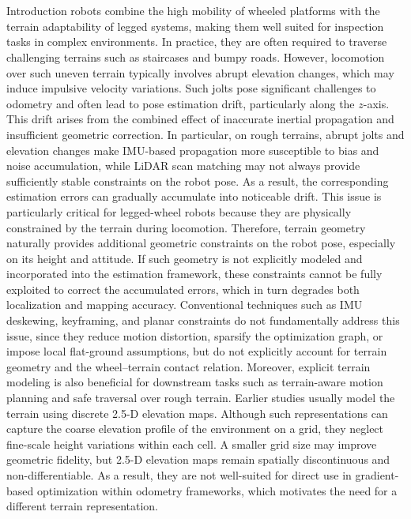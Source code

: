 \documentclass[journal,twoside,web]{ieeecolor}
\makeatletter
\let\origsection\section
\def\section{\@ifstar\sectionstarcolor\sectioncolor}
\def\sectioncolor#1{\origsection{\textcolor{nblue}{#1}}}
\def\sectionstarcolor#1{\origsection*{#1}}
\makeatother
\begin{document}
\maketitle


\section{Introduction}\label{sec:intro}
 robots combine the high mobility of wheeled platforms with the terrain adaptability of legged systems, making them well suited for inspection tasks in complex environments. In practice, they are often required to traverse challenging terrains such as staircases and bumpy roads. However, locomotion over such uneven terrain typically involves abrupt elevation changes, which may induce impulsive velocity variations.
Such jolts pose significant challenges to odometry and often lead to pose estimation drift, particularly along the $z$-axis. This drift arises from the combined effect of inaccurate inertial propagation and insufficient geometric correction. In particular, on rough terrains, abrupt jolts and elevation changes make IMU-based propagation more susceptible to bias and noise accumulation, while LiDAR scan matching may not always provide sufficiently stable constraints on the robot pose. As a result, the corresponding estimation errors can gradually accumulate into noticeable drift.
This issue is particularly critical for legged-wheel robots because they are physically constrained by the terrain during locomotion. Therefore, terrain geometry naturally provides additional geometric constraints on the robot pose, especially on its height and attitude. If such geometry is not explicitly modeled and incorporated into the estimation framework, these constraints cannot be fully exploited to correct the accumulated errors, which in turn degrades both localization and mapping accuracy. Conventional techniques such as IMU deskewing, keyframing, and planar constraints do not fundamentally address this issue, since they reduce motion distortion, sparsify the optimization graph, or impose local flat-ground assumptions, but do not explicitly account for terrain geometry and the wheel–terrain contact relation. Moreover, explicit terrain modeling is also beneficial for downstream tasks such as terrain-aware motion planning and safe traversal over rough terrain.
Earlier studies usually model the terrain using discrete 2.5-D elevation maps. Although such representations can capture the coarse elevation profile of the environment on a grid, they neglect fine-scale height variations within each cell. A smaller grid size may improve geometric fidelity, but 2.5-D elevation maps remain spatially discontinuous and non-differentiable. As a result, they are not well-suited for direct use in gradient-based optimization within odometry frameworks, which motivates the need for a different terrain representation.
\end{document}
